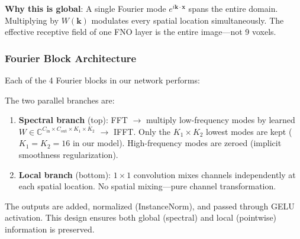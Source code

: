\documentclass[11pt,letterpaper]{article}
\newcommand{\C}{\mathbb{C}}
\newcommand{\xvec}{\bm{x}}
\newcommand{\kvec}{\bm{k}}
\begin{document}
\textbf{Why this is global}: A single Fourier mode $e^{i\kvec \cdot \xvec}$ spans the
entire domain. Multiplying by $W(\kvec)$ modulates every spatial location simultaneously.
The effective receptive field of one FNO layer is the entire image---not 9 voxels.

\subsubsection{Fourier Block Architecture}

Each of the 4 Fourier blocks in our network performs:

\begin{center}
\end{center}

The two parallel branches are:
\begin{enumerate}[leftmargin=2em]
    \item \textbf{Spectral branch} (top): FFT $\to$ multiply low-frequency modes by
          learned $W \in \C^{C_{\mathrm{in}} \times C_{\mathrm{out}} \times K_1 \times K_2}$
          $\to$ IFFT. Only the $K_1 \times K_2$ lowest modes are kept
          ($K_1 = K_2 = 16$ in our model). High-frequency modes are zeroed
          (implicit smoothness regularization).
    \item \textbf{Local branch} (bottom): $1\times1$ convolution mixes channels
          independently at each spatial location. No spatial mixing---pure channel
          transformation.
\end{enumerate}
The outputs are added, normalized (InstanceNorm), and passed through GELU activation.
This design ensures both global (spectral) and local (pointwise) information is preserved.
\end{document}

